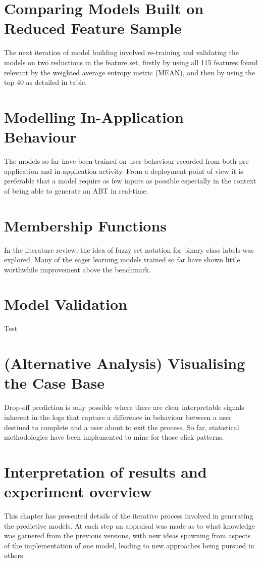 \section{Comparing Models Built on Reduced Feature Sample}
The next iteration of model building involved re-training and validating the models on two reductions in the feature set, firstly by using all 115 features found relevant by the weighted average entropy metric (MEAN), and then by using the top 40 as detailed in table.


\section{Modelling In-Application Behaviour}
The models so far have been trained on user behaviour recorded from both pre-application and in-application activity. From a deployment point of view it is preferable that a model require as few inputs as possible especially in the context of being able to generate an ABT in real-time. 


\section{Membership Functions}
In the literature review, the idea of fuzzy set notation for binary class labels was explored. Many of the eager learning models trained so far have shown little worthwhile improvement above the benchmark.


\section{Model Validation}
Test


\section{(Alternative Analysis) Visualising the Case Base}
Drop-off prediction is only possible where there are clear interpretable signals inherent in the logs that capture a difference in behaviour between a user destined to complete and a user about to exit the process. So far, statistical methodologies have been implemented to mine for those click patterns. 


\section{Interpretation of results and experiment overview}
This chapter has presented details of the iterative process involved in generating the predictive models. At each step an appraisal was made as to what knowledge was garnered from the previous versions, with new ideas spawning from aspects of the implementation of one model, leading to new approaches being pursued in others. 
